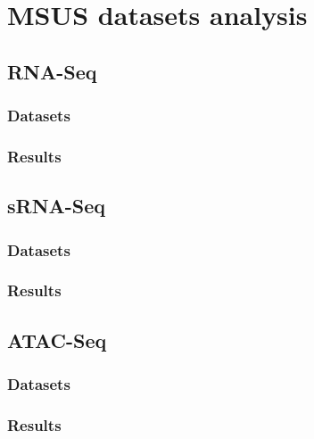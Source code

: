 \documentclass[12pt,twoside]{reedthesis}
\begin{document}
\hypertarget{msus-datasets-analysis}{%
\chapter{MSUS datasets analysis}\label{msus-datasets-analysis}}

\hypertarget{rna-seq}{%
\section{RNA-Seq}\label{rna-seq}}

\hypertarget{datasets}{%
\subsection{Datasets}\label{datasets}}

\hypertarget{results}{%
\subsection{Results}\label{results}}

\clearpage

\hypertarget{srna-seq}{%
\section{sRNA-Seq}\label{srna-seq}}

\hypertarget{datasets-1}{%
\subsection{Datasets}\label{datasets-1}}

\hypertarget{results-1}{%
\subsection{Results}\label{results-1}}

\clearpage

\hypertarget{atac-seq}{%
\section{ATAC-Seq}\label{atac-seq}}

\hypertarget{datasets-2}{%
\subsection{Datasets}\label{datasets-2}}

\hypertarget{results-2}{%
\subsection{Results}\label{results-2}}
\end{document}
